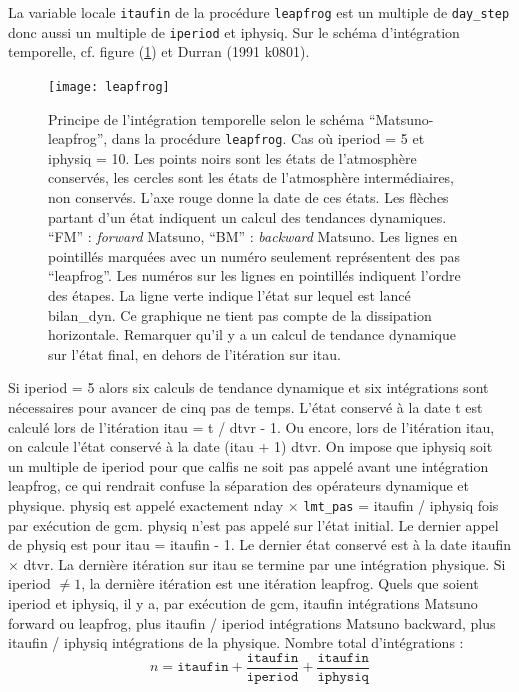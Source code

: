 \documentclass[a4paper,english,french]{article}
\newcommand{\Eng}[1]{\textit{\foreignlanguage{english}{#1}}}
\begin{document}
La variable locale \verb+itaufin+ de la procédure \verb+leapfrog+ est
un multiple de \verb+day_step+ donc aussi un multiple de
\verb+iperiod+ et iphysiq. Sur le schéma d'intégration temporelle,
cf. figure (\ref{fig:leapfrog}) et Durran (1991 k0801).
\begin{figure}
  \centering
  \texttt{[image: leapfrog]}
  \caption[Schéma Matsuno-leapfrog]{Principe de l'intégration
    temporelle selon le schéma ``Matsuno-leapfrog'', dans la procédure
    \texttt{leapfrog}. Cas où iperiod = 5 et iphysiq = 10. Les points
    noirs sont les états de l'atmosphère conservés, les cercles sont
    les états de l'atmosphère intermédiaires, non conservés. L'axe
    rouge donne la date de ces états. Les flèches partant d'un état
    indiquent un calcul des tendances dynamiques. ``FM'' :
    \Eng{forward} Matsuno, ``BM'' : \Eng{backward} Matsuno. Les lignes
    en pointillés marquées avec un numéro seulement représentent des
    pas ``leapfrog''. Les numéros sur les lignes en pointillés
    indiquent l'ordre des étapes. La ligne verte indique l'état sur
    lequel est lancé bilan\_dyn. Ce graphique ne tient pas compte de
    la dissipation horizontale. Remarquer qu'il y a un calcul de
    tendance dynamique sur l'état final, en dehors de l'itération sur
    itau.}
  \label{fig:leapfrog}
\end{figure}
Si iperiod = 5 alors six calculs de tendance dynamique et six
intégrations sont nécessaires pour avancer de cinq pas de
temps. L'état conservé à la date t est calculé lors de l'itération
itau = t / dtvr - 1. Ou encore, lors de l'itération itau, on calcule
l'état conservé à la date (itau + 1) dtvr. On impose que iphysiq soit
un multiple de iperiod pour que calfis ne soit pas appelé avant une
intégration leapfrog, ce qui rendrait confuse la séparation des
opérateurs dynamique et physique. physiq est appelé exactement nday
$\times$ \verb+lmt_pas+ = itaufin / iphysiq fois par exécution de
gcm. physiq n'est pas appelé sur l'état initial. Le dernier appel de
physiq est pour itau = itaufin - 1. Le dernier état conservé est à la
date itaufin $\times$ dtvr. La dernière itération sur itau se termine
par une intégration physique. Si iperiod $\ne 1$, la dernière
itération est une itération leapfrog. Quels que soient iperiod et
iphysiq, il y a, par exécution de gcm, itaufin intégrations Matsuno
forward ou leapfrog, plus itaufin / iperiod intégrations Matsuno
backward, plus itaufin / iphysiq intégrations de la physique. Nombre
total d'intégrations :
\begin{equation*}
  n = \mathtt{itaufin} + \frac{\mathtt{itaufin}}{\mathtt{iperiod}}
  + \frac{\mathtt{itaufin}}{\mathtt{iphysiq}}
\end{equation*}
\end{document}
